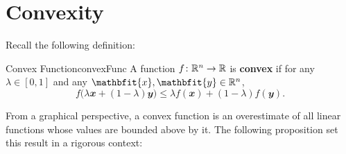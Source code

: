 \documentclass[math]{amznotes}
\theoremstyle{remark}
\begin{document}
\section{Convexity}
Recall the following definition:
\begin{dfnbox}{Convex Function}{convexFunc}
    A function $f \colon \mathbb{R}^n \to \mathbb{R}$ is {\color{red} \textbf{convex}} if for any $\lambda \in [0, 1]$ and any $\mathbfit{x}, \mathbfit{y} \in \R^n$,
    \begin{equation*}
        f\bigl(\lambda\mathbfit{x} + \left(1 - \lambda\right)\mathbfit{y}\bigr) \leq \lambda f\left(\mathbfit{x}\right) + \left(1 - \lambda\right)f\left(\mathbfit{y}\right).
    \end{equation*}
\end{dfnbox}
From a graphical perspective, a convex function is an overestimate of all linear functions whose values are bounded above by it. The following proposition set this result in a rigorous context:
\end{document}
